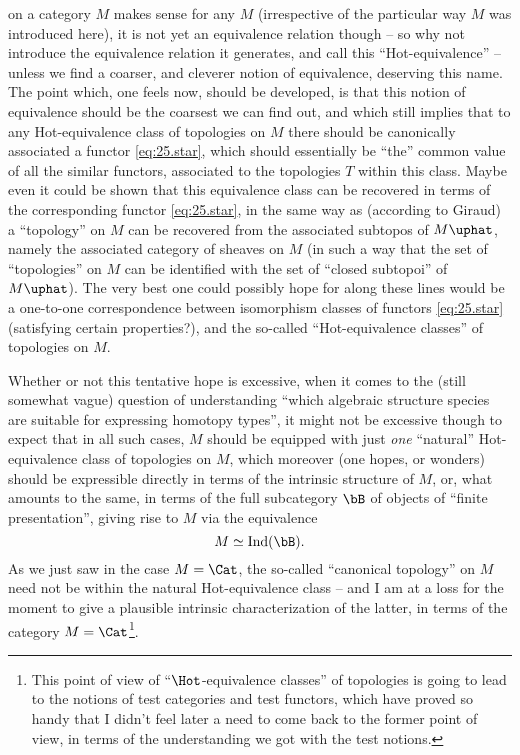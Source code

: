 on a category $M$ makes sense for any $M$ (irrespective of the
particular way $M$ was introduced here), it is not yet an equivalence
relation though -- so why not introduce the equivalence relation it
generates, and call this ``Hot-equivalence'' -- unless we find a
coarser, and cleverer notion of equivalence, deserving this name. The
point which, one feels now, should be developed, is that this notion
of equivalence should be the coarsest we can find out, and which still
implies that to any Hot-equivalence class of topologies on $M$ there
should be canonically associated a functor \eqref{eq:25.star}, which
should essentially be ``the'' common value of all the similar
functors, associated to the topologies $T$ within this
class. Maybe even it could be shown that this equivalence class can be
recovered in terms of the corresponding functor \eqref{eq:25.star}, in
the same way as (according to Giraud) a ``topology'' on $M$ can be
recovered from the associated subtopos of $M\uphat$, namely the
associated category of sheaves on $M$ (in such a way that the set of
``topologies'' on $M$ can be identified with the set of ``closed
subtopoi'' of $M\uphat$). The very best one could possibly hope for
along these lines would be a one-to-one correspondence between
isomorphism classes of functors \eqref{eq:25.star} (satisfying certain
properties?), and the so-called ``Hot-equivalence classes'' of
topologies on $M$.

Whether or not this tentative hope is excessive, when it comes to the
(still somewhat vague) question of understanding ``which algebraic
structure species are suitable for expressing homotopy types'', it
might not be excessive though to expect that in all such cases, $M$
should be equipped with just \emph{one} ``natural'' Hot-equivalence
class of topologies on $M$, which moreover (one hopes, or wonders)
should be expressible directly in terms of the intrinsic structure of
$M$, or, what amounts to the same, in terms of the full subcategory
$\bB$ of objects of ``finite presentation'', giving rise to $M$ via
the equivalence
\[ M \simeq \text{Ind}(\bB). \]
As we just saw in the case $M = \Cat$, the so-called
``canonical topology'' on $M$ need not be within the natural
Hot-equivalence class -- and I am at a loss for the moment to give a
plausible intrinsic characterization of the latter, in terms of the
category $M=\Cat$\footnote{This point of view of ``$\Hot$-equivalence classes'' of topologies is going to lead to the notions of test categories and test functors, which have proved so handy that I didn't feel later a need to come back to the former point of view, in terms of the understanding we got with the test notions.}.

